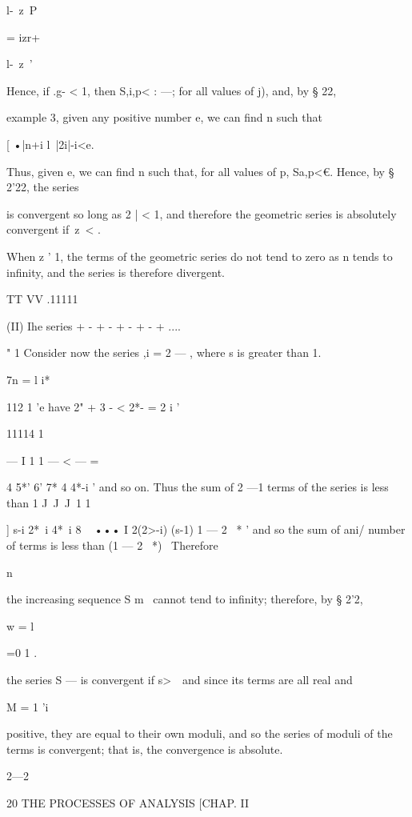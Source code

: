 l-\ z\ P



= izr+



l-\ z\ '



Hence, if .g- < 1, then S,i,p< : —; for all values of j), and, by §
22,

example 3, given any positive number e, we can find n such that

[ •|n+i l\ |2i|-i<e.

Thus, given e, we can find n such that, for all values of p, Sa,p<€.
Hence, by § 2'22, the series

is convergent so long as 2 | < 1, and therefore the geometric series
is absolutely convergent if\ z\ < .

When z ' 1, the terms of the geometric series do not tend to zero as n
tends to infinity, and the series is therefore divergent.

TT VV .11111

(II) Ihe series + - + - + - + - + ....

" 1 Consider now the series ,i = 2 — , where s is greater than 1.

7n = l i*

112 1 'e have 2" + 3 - < 2*- = 2 i '

11114 1

— I 1 1 — < — =

4 5*' 6' 7* 4 4*-i ' and so on. Thus the sum of 2 —1 terms of the
series is less than 1 J\ J\ J\ 1 1



] s-i 2*~i 4*~i 8 ~ ••• I 2(2>-i) (s-1) 1 — 2 ~* ' and so the sum of
ani/ number of terms is less than (1 — 2 ~*)~ Therefore

n

the increasing sequence S m~ cannot tend to infinity; therefore, by §
2'2,

w = l

=0 1 .

the series S — is convergent if s>\ \ and since its terms are all real
and

M = 1 'i

positive, they are equal to their own moduli, and so the series of
moduli of the terms is convergent; that is, the convergence is
absolute.

2—2



20 THE PROCESSES OF ANALYSIS [CHAP. II

